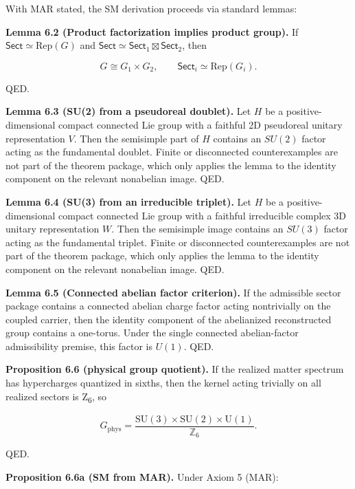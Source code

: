 With MAR stated, the SM derivation proceeds via standard lemmas:

\textbf{Lemma 6.2 (Product factorization implies product group).} If \(\mathsf{Sect} \simeq \mathrm{Rep}(G)\) and \(\mathsf{Sect} \simeq \mathsf{Sect}_1 \boxtimes \mathsf{Sect}_2\), then

\[
G \cong G_1 \times G_2,
\qquad
\mathsf{Sect}_i \simeq \mathrm{Rep}(G_i).
\]

QED.

\textbf{Lemma 6.3 (SU(2) from a pseudoreal doublet).} Let \(H\) be a positive-dimensional compact connected Lie group with a faithful 2D pseudoreal unitary representation \(V\). Then the semisimple part of \(H\) contains an \(SU(2)\) factor acting as the fundamental doublet. Finite or disconnected counterexamples are not part of the theorem package, which only applies the lemma to the identity component on the relevant nonabelian image. QED.

\textbf{Lemma 6.4 (SU(3) from an irreducible triplet).} Let \(H\) be a positive-dimensional compact connected Lie group with a faithful irreducible complex 3D unitary representation \(W\). Then the semisimple image contains an \(SU(3)\) factor acting as the fundamental triplet. Finite or disconnected counterexamples are not part of the theorem package, which only applies the lemma to the identity component on the relevant nonabelian image. QED.

\textbf{Lemma 6.5 (Connected abelian factor criterion).} If the admissible sector package contains a connected abelian charge factor acting nontrivially on the coupled carrier, then the identity component of the abelianized reconstructed group contains a one-torus. Under the single connected abelian-factor admissibility premise, this factor is \(U(1)\). QED.

\textbf{Proposition 6.6 (physical group quotient).} If the realized matter spectrum has hypercharges quantized in sixths, then the kernel acting trivially on all realized sectors is Z\textsubscript{6}, so

\[
G_{\mathrm{phys}} = \frac{\mathrm{SU}(3)\times \mathrm{SU}(2)\times \mathrm{U}(1)}{\mathbb Z_6}.
\]

QED.

\textbf{Proposition 6.6a (SM from MAR).} Under Axiom 5 (MAR):

